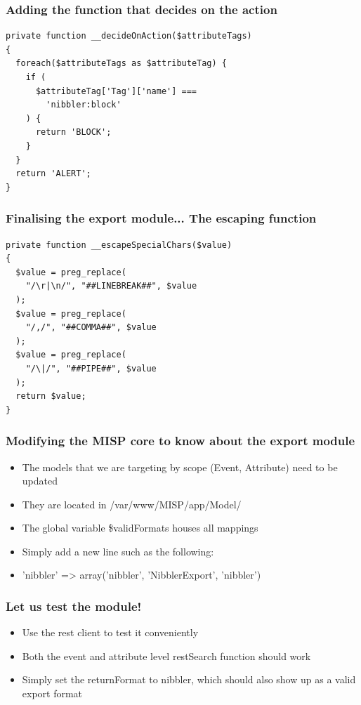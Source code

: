 \begin{frame}[fragile]
  \frametitle{Adding the function that decides on the action}
  \begin{lstlisting}
private function __decideOnAction($attributeTags)
{
  foreach($attributeTags as $attributeTag) {
    if (
      $attributeTag['Tag']['name'] ===
        'nibbler:block'
    ) {
      return 'BLOCK';
    }
  }
  return 'ALERT';
}
  \end{lstlisting}
\end{frame}

\begin{frame}[fragile]
  \frametitle{Finalising the export module... The escaping function}
  \begin{lstlisting}
private function __escapeSpecialChars($value)
{
  $value = preg_replace(
    "/\r|\n/", "##LINEBREAK##", $value
  );
  $value = preg_replace(
    "/,/", "##COMMA##", $value
  );
  $value = preg_replace(
    "/\|/", "##PIPE##", $value
  );
  return $value;
}
  \end{lstlisting}
\end{frame}

\begin{frame}[fragile]
  \frametitle{Modifying the MISP core to know about the export module}
  \begin{itemize}
    \item The models that we are targeting by scope (Event, Attribute) need to be updated
    \item They are located in /var/www/MISP/app/Model/
    \item The global variable \$validFormats houses all mappings
    \item Simply add a new line such as the following:
    \item 'nibbler' => array('nibbler', 'NibblerExport', 'nibbler')
  \end{itemize}
\end{frame}

\begin{frame}[fragile]
  \frametitle{Let us test the module!}
  \begin{itemize}
    \item Use the rest client to test it conveniently
    \item Both the event and attribute level restSearch function should work
    \item Simply set the returnFormat to nibbler, which should also show up as a valid export format
  \end{itemize}
\end{frame}

